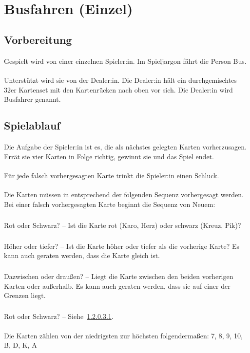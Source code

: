 \section{Busfahren (Einzel)}\label{Busfahren_solo}
\subsection{Vorbereitung}
\paragraph{}
Gespielt wird von einer einzelnen Spieler:in.
Im Spieljargon \glqq{} fährt die Person Bus\grqq{}.

\paragraph{}
Unterstützt wird sie von der Dealer:in.
Die Dealer:in hält ein durchgemischtes 32er Kartenset mit den Kartenrücken nach oben vor sich.
Die Dealer:in wird \glqq{} Busfahrer\grqq{} genannt.

\subsection{Spielablauf}
\paragraph{}
Die Aufgabe der Spieler:in ist es, die als nächstes gelegten Karten vorherzusagen.
Errät sie vier Karten in Folge richtig, gewinnt sie und das Spiel endet.

\paragraph{}
Für jede falsch vorhergesagten Karte trinkt die Spieler:in einen Schluck.

\paragraph{}
Die Karten müssen in entsprechend der folgenden Sequenz vorhergesagt werden.
Bei einer falsch vorhergesagten Karte beginnt die Sequenz von Neuem:
\subparagraph{}\label{Busfahren_solo:Spielablauf:Fragen:RS}
Rot oder Schwarz? – Ist die Karte rot (Karo, Herz) oder schwarz (Kreuz, Pik)?
\subparagraph{}
Höher oder tiefer? – Ist die Karte höher oder tiefer als die vorherige Karte?
Es kann auch geraten werden, dass die Karte gleich ist.
\subparagraph{}
Dazwischen oder draußen? – Liegt die Karte zwischen den beiden vorherigen Karten oder außerhalb.
Es kann auch geraten werden, dass sie auf einer der Grenzen liegt.
\subparagraph{}
Rot oder Schwarz? – Siehe~\ref{Busfahren_solo:Spielablauf:Fragen:RS}.

\paragraph{}
Die Karten zählen von der niedrigsten zur höchsten folgendermaßen: 7, 8, 9, 10, B, D, K, A

